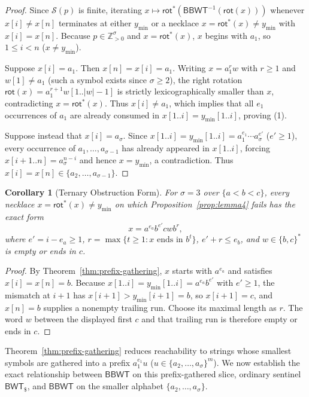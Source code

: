 \documentclass[11pt,a4paper]{article}
\newtheorem{corollary}{Corollary}
\theoremstyle{definition}
\newcommand{\BBWT}{\mathsf{BBWT}}
\newcommand{\BWT}{\mathsf{BWT}}
\newcommand{\rot}{\mathsf{rot}}
\begin{document}
\begin{proof}
Since $\mathcal{S}(p)$ is finite, iterating $x \mapsto \rot^*(\BBWT^{-1}(\rot(x)))$ whenever $x[i] \neq x[n]$ terminates at either $y_{\min}$ or a necklace $x = \rot^*(x) \neq y_{\min}$ with $x[i] = x[n]$. Because $p \in \mathbb{Z}_{>0}^\sigma$ and $x = \rot^*(x)$, $x$ begins with $a_1$, so $1 \le i < n$ ($x \neq y_{\min}$).

Suppose $x[i] = a_1$. Then $x[n] = x[i] = a_1$. Writing $x = a_1^r w$ with $r \ge 1$ and $w[1] \neq a_1$ (such a symbol exists since $\sigma \ge 2$), the right rotation $\rot(x) = a_1^{r+1} w[1..|w|-1]$ is strictly lexicographically smaller than $x$, contradicting $x = \rot^*(x)$. Thus $x[i] \neq a_1$, which implies that all $e_1$ occurrences of $a_1$ are already consumed in $x[1..i] = y_{\min}[1..i]$, proving (1).

Suppose instead that $x[i] = a_\sigma$. Since $x[1..i] = y_{\min}[1..i] = a_1^{e_1}\cdots a_\sigma^{e'}$ ($e' \ge 1$), every occurrence of $a_1, \dots, a_{\sigma-1}$ has already appeared in $x[1..i]$, forcing $x[i+1..n] = a_\sigma^{n-i}$ and hence $x = y_{\min}$, a contradiction. Thus $x[i] = x[n] \in \{a_2, \dots, a_{\sigma-1}\}$.
\end{proof}

\begin{corollary}[Ternary Obstruction Form]
\label{cor:ternary-obs}
For $\sigma = 3$ over $\{a < b < c\}$, every necklace $x = \rot^*(x) \neq y_{\min}$ on which Proposition~\ref{prop:lemma4} fails has the exact form
\[
x = a^{e_a} b^{e'} c w b^r,
\]
where $e'=i-e_a\ge1$, $r=\max\{t\ge1:x\text{ ends in }b^t\}$, $e'+r\le e_b$, and $w\in\{b,c\}^*$ is empty or ends in $c$.
\end{corollary}

\begin{proof}
By Theorem~\ref{thm:prefix-gathering}, $x$ starts with $a^{e_a}$ and satisfies $x[i] = x[n] = b$. Because $x[1..i] = y_{\min}[1..i] = a^{e_a} b^{e'}$ with $e' \ge 1$, the mismatch at $i+1$ has $x[i+1] > y_{\min}[i+1] = b$, so $x[i+1] = c$, and $x[n]=b$ supplies a nonempty trailing run. Choose its maximal length as $r$. The word $w$ between the displayed first $c$ and that trailing run is therefore empty or ends in $c$.
\end{proof}

Theorem~\ref{thm:prefix-gathering} reduces reachability to strings whose smallest symbols are gathered into a prefix $a_1^{e_1} u$ ($u \in \{a_2,\dots,a_\sigma\}^m$). We now establish the exact relationship between $\BBWT$ on this prefix-gathered slice, ordinary sentinel $\BWT_{\$}$, and $\BBWT$ on the smaller alphabet $\{a_2,\dots,a_\sigma\}$.
\end{document}
